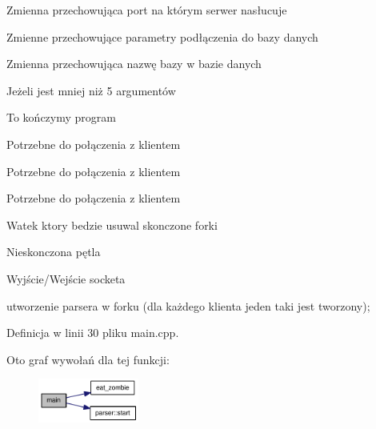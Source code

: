 Zmienna przechowująca port na którym serwer nasłucuje

Zmienne przechowujące parametry podłączenia do bazy danych

Zmienna przechowująca nazwę bazy w bazie danych

Jeżeli jest mniej niż 5 argumentów

To kończymy program

Potrzebne do połączenia z klientem

Potrzebne do połączenia z klientem

Potrzebne do połączenia z klientem

Watek ktory bedzie usuwal skonczone forki

Nieskonczona pętla

Wyjście/Wejście socketa

utworzenie parsera w forku (dla każdego klienta jeden taki jest tworzony); 

Definicja w linii 30 pliku main.cpp.

Oto graf wywołań dla tej funkcji:\nopagebreak
\begin{figure}[H]
\begin{center}
\leavevmode
\includegraphics[width=94pt]{da/da0/a00009_0ddf1224851353fc92bfbff6f499fa97_cgraph}
\end{center}
\end{figure}
